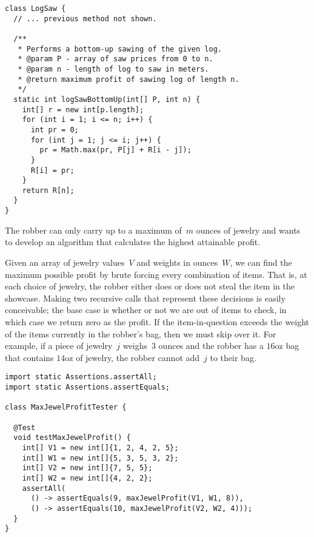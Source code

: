 \begin{lstlisting}[language=MyJava]
class LogSaw {
  // ... previous method not shown.

  /**
   * Performs a bottom-up sawing of the given log.
   * @param P - array of saw prices from 0 to n.
   * @param n - length of log to saw in meters.
   * @return maximum profit of sawing log of length n.
   */
  static int logSawBottomUp(int[] P, int n) {
    int[] r = new int[p.length];
    for (int i = 1; i <= n; i++) {
      int pr = 0;
      for (int j = 1; j <= i; j++) {
        pr = Math.max(pr, P[j] + R[i - j]);
      }
      R[i] = pr;
    }
    return R[n];
  }
}
\end{lstlisting}

The robber can only carry up to a maximum of~$m$ ounces of jewelry and wants to develop an algorithm that calculates the highest attainable profit.

Given an array of jewelry values~$V$ and weights in ounces~$W$, we can find the maximum possible profit by brute forcing every combination of items. 
That is, at each choice of jewelry, the robber either does or does not steal the item in the showcase. 
Making two recursive calls that represent these decisions is easily conceivable; 
the base case is whether or not we are out of items to check, in which case we return zero as the profit. 
If the item-in-question exceeds the weight of the items currently in the robber's bag, then we must skip over it. 
For example, if a piece of jewelry~$j$ weighs~$3$ ounces and the robber has a $16\text{oz}$ bag that contains $14\text{oz}$ of jewelry, the robber cannot add~$j$ to their bag.

\begin{lstlisting}[language=MyJava]
import static Assertions.assertAll;
import static Assertions.assertEquals;

class MaxJewelProfitTester {

  @Test
  void testMaxJewelProfit() {
    int[] V1 = new int[]{1, 2, 4, 2, 5};
    int[] W1 = new int[]{5, 3, 5, 3, 2};
    int[] V2 = new int[]{7, 5, 5};
    int[] W2 = new int[]{4, 2, 2};
    assertAll(
      () -> assertEquals(9, maxJewelProfit(V1, W1, 8)),
      () -> assertEquals(10, maxJewelProfit(V2, W2, 4)));
  }
}
\end{lstlisting}

